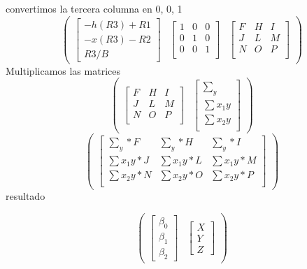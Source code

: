 \documentclass{article}
\begin{document}
convertimos la tercera columna en 0, 0, 1
\[
\begin{pmatrix}
\begin{bmatrix}
  -h(R3)+R1 \\
  -x(R3)-R2 \\
  R3/B
\end{bmatrix}
&
\begin{bmatrix}
1 & 0 & 0\\
0 & 1 & 0\\
0 & 0 & 1 \\
\end{bmatrix}
&
\begin{bmatrix}
  F & H & I\\
  J & L & M \\
  N & O & P \\
\end{bmatrix}
\end{pmatrix}
\]
Multiplicamos las matrices
\[
\begin{pmatrix}
  \begin{bmatrix}
    F & H & I\\
    J & L & M \\
    N & O & P \\
  \end{bmatrix}
&
\begin{bmatrix}
\sum_y \\
\sum{x_{1}y} \\ 
\sum{x_{2}y} \\ 
\end{bmatrix}
\end{pmatrix}
\]
\[
\begin{pmatrix}
  \begin{bmatrix}
    \sum_y * F & \sum_y * H & \sum_y * I\\
    \sum{x_{1}y} * J & \sum{x_{1}y} * L & \sum{x_{1}y} * M \\
    \sum{x_{2}y} * N & \sum{x_{2}y} * O & \sum{x_{2}y} * P \\
  \end{bmatrix}
\end{pmatrix}
\]
resultado

\[
\begin{pmatrix}
\begin{bmatrix}
  \beta_0 \\
  \beta_1 \\
  \beta_2
\end{bmatrix}
&
\begin{bmatrix}
X \\
Y \\
Z
\end{bmatrix}
\end{pmatrix}
\]
\end{document}
